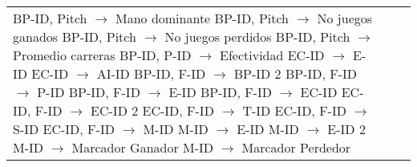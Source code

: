\documentclass{report}
\begin{document}
\begin{tabularx}{\textwidth}{|X|X|X|}
        BP-ID, Pitch $\rightarrow$ Mano dominante \newline 
        BP-ID, Pitch $\rightarrow$ No juegos ganados \newline 
        BP-ID, Pitch $\rightarrow$ No juegos perdidos \newline 
        BP-ID, Pitch $\rightarrow$ Promedio carreras \newline 
        BP-ID, P-ID $\rightarrow$ Efectividad \newline 
        EC-ID $\rightarrow$ E-ID \newline 
        EC-ID $\rightarrow$ AI-ID \newline 
        BP-ID, F-ID $\rightarrow$ BP-ID 2 \newline 
        BP-ID, F-ID $\rightarrow$ P-ID \newline 
        BP-ID, F-ID $\rightarrow$ E-ID \newline 
        BP-ID, F-ID $\rightarrow$ EC-ID \newline 
        EC-ID, F-ID $\rightarrow$ EC-ID 2 \newline 
        EC-ID, F-ID $\rightarrow$ T-ID \newline 
        EC-ID, F-ID $\rightarrow$ S-ID \newline 
        EC-ID, F-ID $\rightarrow$ M-ID \newline 
        M-ID $\rightarrow$ E-ID \newline 
        M-ID $\rightarrow$ E-ID 2 \newline 
        M-ID $\rightarrow$ Marcador Ganador \newline 
        M-ID $\rightarrow$ Marcador Perdedor & 


\end{tabularx}
\end{document}
